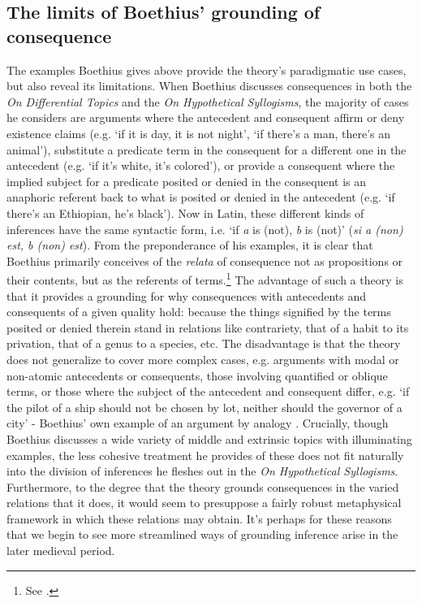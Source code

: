 \documentclass[a4paper, 11pt]{article}
\begin{document}
\subsection{The limits of Boethius' grounding of consequence}
The examples Boethius gives above provide the theory's paradigmatic use cases, but also reveal its limitations. When Boethius discusses consequences in both the \emph{On Differential Topics} and the \emph{On Hypothetical Syllogisms}, the majority of cases he considers are arguments where the antecedent and consequent affirm or deny existence claims (e.g. `if it is day, it is not night', `if there's a man, there's an animal'), substitute a predicate term in the consequent for a different one in the antecedent (e.g. `if it's white, it's colored'), or provide a consequent where the implied subject for a predicate posited or denied in the consequent is an anaphoric referent back to what is posited or denied in the antecedent (e.g. `if there's an Ethiopian, he's black'). Now in Latin, these different kinds of inferences have the same syntactic form, i.e.  `if \emph{a} is (not), \emph{b} is (not)' (\emph{si a (non) est, b (non) est}). From the preponderance of his examples, it is clear that Boethius primarily conceives of the \emph{relata} of consequence not as propositions or their contents, but as the referents of terms.\footnote{See \autocite{Martin2007,Bosman2018}.} The advantage of such a theory is that it provides a grounding for why consequences with antecedents and consequents of a given quality hold: because the things signified by the terms posited or denied therein stand in relations like contrariety, that of a habit to its privation, that of a genus to a species, etc. The disadvantage is that the theory does not generalize to cover more complex cases, e.g. arguments with modal or non-atomic antecedents or consequents, those involving quantified or oblique terms, or those where the subject of the antecedent and consequent differ, e.g. `if the pilot of a ship should not be chosen by lot, neither should the governor of a city' - Boethius' own example of an argument by analogy \autocite[1191A-B]{BDT}. Crucially, though Boethius discusses a wide variety of middle and extrinsic topics with illuminating examples, the less cohesive treatment he provides of these does not fit naturally into the division of inferences he fleshes out in the \emph{On Hypothetical Syllogisms}. Furthermore, to the degree that the theory grounds consequences in the varied relations that it does, it would seem to presuppose a fairly robust metaphysical framework in which these relations may obtain. It's perhaps for these reasons that we begin to see more streamlined ways of grounding inference arise in the later medieval period.
\end{document}
